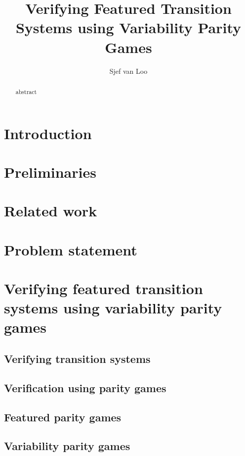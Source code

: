 \documentclass[]{article}
\title{Verifying Featured Transition Systems using Variability Parity Games}
\author{Sjef van Loo}
\begin{document}
\maketitle
\begin{abstract}
	abstract
\end{abstract}

\newpage
\tableofcontents

\pagebreak
\section{Introduction}


\section{Preliminaries}


\section{Related work}


\section{Problem statement}


\pagebreak
\section{Verifying featured transition systems using variability parity games}
\label{part:verifying}

\subsection{Verifying transition systems}


\subsection{Verification using parity games}


\subsection{Featured parity games}


\subsection{Variability parity games}

\end{document}
